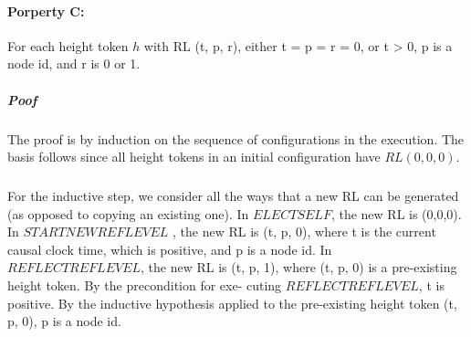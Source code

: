 \paragraph{Porperty C:}For each height token $h$ with RL (t, p, r), either t = p = r = 0, or t > 0, p is a node id, and r is 0 or 1.
\subparagraph{Poof}The proof is by induction on the sequence of configurations in the execution. The basis follows since all height tokens in an initial configuration have $RL (0, 0, 0)$.
\subparagraph{}For the inductive step, we consider all the ways that a new RL can be generated (as opposed to copying an existing one). In $ELECTSELF$, the new RL is (0,0,0). In $STARTNEWREFLEVEL$ , the new RL is (t, p, 0), where t is the current causal clock time, which is positive, and p is a node id. In $REFLECTREFLEVEL$, the new RL is (t, p, 1), where (t, p, 0) is a pre-existing height token. By the precondition for exe- cuting $REFLECTREFLEVEL$, t is positive. By the inductive hypothesis applied to the pre-existing height token (t, p, 0), p is a node id.
